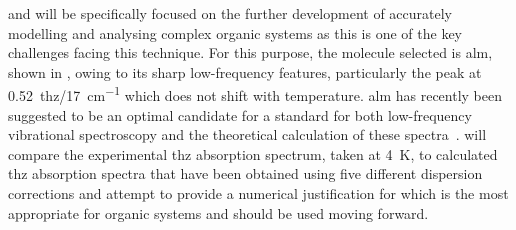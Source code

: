  and  will be specifically focused on the further development of accurately modelling and analysing complex organic systems as this is one of the key challenges facing this technique. For this purpose, the molecule selected is \acrfull{alm}, shown in , owing to its sharp low-frequency features, particularly the peak at \SI{0.52}{\acrshort{thz}}/\SI{17}{cm^{-1}} which does not shift with temperature. \acrshort{alm} has recently been suggested to be an optimal candidate for a standard for both low\nobreakdash-frequency vibrational spectroscopy and the theoretical calculation of these spectra~\cite{Dampf2020}.  will compare the experimental \acrshort{thz} absorption spectrum, taken at \SI{4}{K}, to calculated \acrshort{thz} absorption spectra that have been obtained using five different dispersion corrections and attempt to provide a numerical justification for which is the most appropriate for organic systems and should be used moving forward.

